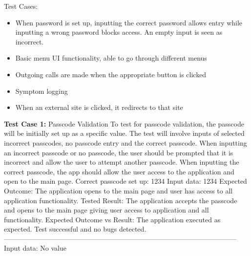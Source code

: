 \documentclass[letterpaper,12pt,titlepage]{article}
\begin{document}
Test Cases:
\begin{itemize}
\item When password is set up, inputting the correct password allows entry while inputting a wrong password blocks access. An empty input is seen as incorrect.
\item Basic menu UI functionality, able to go through different menus
\item Outgoing calls are made when the appropriate button is clicked
\item Symptom logging
\item When an external site is clicked, it redirects to that site
\end{itemize}
\vspace{.2in}
\noindent
\textbf{Test Case 1:} Passcode Validation
\newline
\newline
To test for passcode validation, the passcode will be initially set up as a specific value. The test will involve inputs of selected incorrect passcodes, no passcode entry and the correct passcode. When inputting an incorrect passcode or no passcode, the user should be prompted that it is incorrect and allow the user to attempt another passcode. When inputting the correct passcode, the app should allow the user access to the application and open to the main page.
\newline
\newline
Correct passcode set up: 1234
\newline
\newline
Input data: 1234
\newline
\newline
Expected Outcome: The application opens to the main page and user has access to all application functionality.
\newline
\newline
Tested Result: The application accepts the passcode and opens to the main page giving user access to application and all functionality.
\newline
\newline
Expected Outcome vs Result: The application executed as expected. Test successful and no bugs detected.
\newline
\newline
------------------------------------------------------------------------------------------------------
\newline
Input data: No value
\newline
\newline
\end{document}
